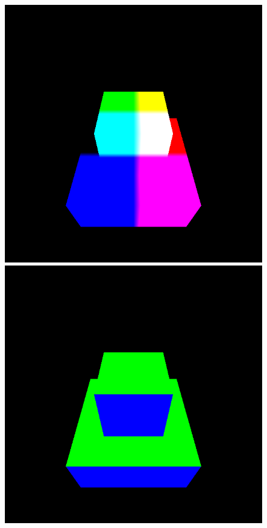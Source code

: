 \documentclass[format=sigconf]{acmart}
\begin{document}
\begin{figure}[h]
  \begin{center}
    \begin{minipage}{.2\textwidth}
      \includegraphics[width=1.0\textwidth]{pipeline-position.png}
    \end{minipage}
    \begin{minipage}{.2\textwidth}
      \includegraphics[width=1.0\textwidth]{pipeline-normal.png}

\end{minipage}
\end{center}
\end{figure}
\end{document}

